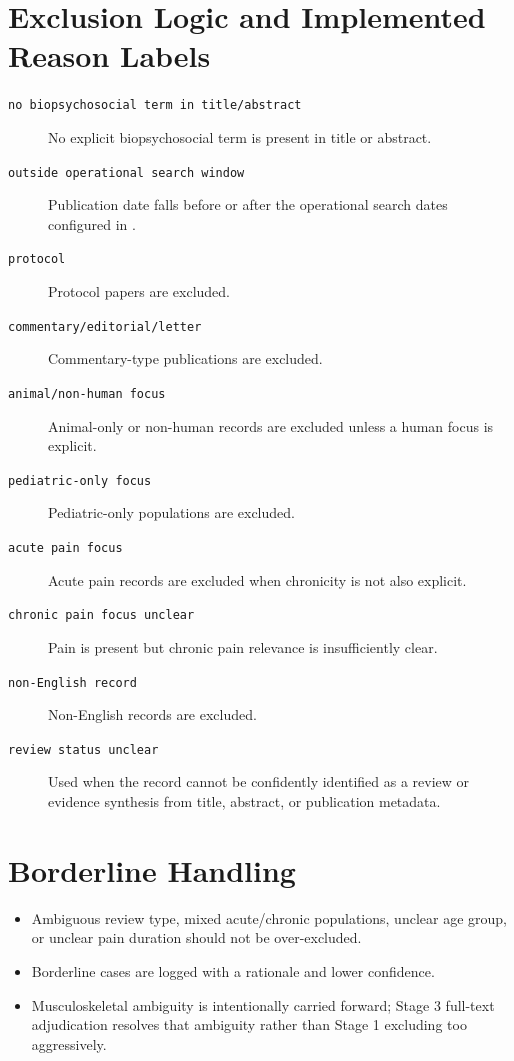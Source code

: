 \documentclass[11pt]{article}
\begin{document}
\section*{Exclusion Logic and Implemented Reason Labels}
\begin{description}
\item[\texttt{no biopsychosocial term in title/abstract}] No explicit biopsychosocial term is present in title or abstract.
\item[\texttt{outside operational search window}] Publication date falls before or after the operational search dates configured in .
\item[\texttt{protocol}] Protocol papers are excluded.
\item[\texttt{commentary/editorial/letter}] Commentary-type publications are excluded.
\item[\texttt{animal/non-human focus}] Animal-only or non-human records are excluded unless a human focus is explicit.
\item[\texttt{pediatric-only focus}] Pediatric-only populations are excluded.
\item[\texttt{acute pain focus}] Acute pain records are excluded when chronicity is not also explicit.
\item[\texttt{chronic pain focus unclear}] Pain is present but chronic pain relevance is insufficiently clear.
\item[\texttt{non-English record}] Non-English records are excluded.
\item[\texttt{review status unclear}] Used when the record cannot be confidently identified as a review or evidence synthesis from title, abstract, or publication metadata.
\end{description}

\section*{Borderline Handling}
\begin{itemize}
\item Ambiguous review type, mixed acute/chronic populations, unclear age group, or unclear pain duration should not be over-excluded.
\item Borderline cases are logged with a rationale and lower confidence.
\item Musculoskeletal ambiguity is intentionally carried forward; Stage 3 full-text adjudication resolves that ambiguity rather than Stage 1 excluding too aggressively.
\end{itemize}
\end{document}
